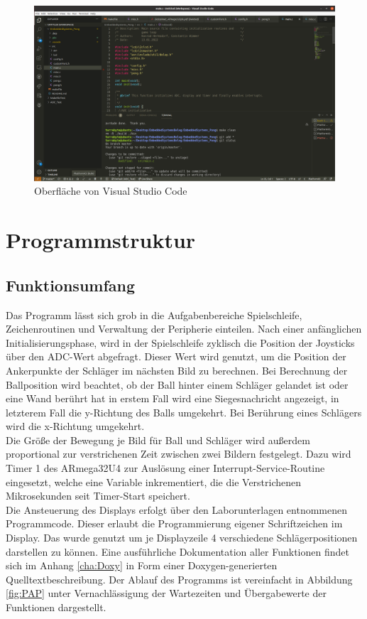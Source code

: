 \begin{figure}[H]
\includegraphics[width=\textwidth]{./Bilder/Code.png}
\caption{Oberfläche von Visual Studio Code}
\end{figure}

\section{Programmstruktur}
\subsection{Funktionsumfang}
\label{sec:Funktionsumfang}
Das Programm lässt sich grob in die Aufgabenbereiche Spielschleife, Zeichenroutinen und Verwaltung der Peripherie einteilen. Nach einer anfänglichen Initialisierungsphase, wird in der Spielschleife zyklisch die Position der Joysticks über den ADC-Wert abgefragt. Dieser Wert wird genutzt, um die Position der Ankerpunkte der Schläger im nächsten Bild zu berechnen. Bei Berechnung der Ballposition wird beachtet, ob der Ball hinter einem Schläger gelandet ist oder eine Wand berührt hat in erstem Fall wird eine Siegesnachricht angezeigt, in letzterem Fall die y-Richtung des Balls umgekehrt. Bei Berührung eines Schlägers wird die x-Richtung umgekehrt.\\
Die Größe der Bewegung je Bild für Ball und Schläger wird außerdem proportional zur verstrichenen Zeit zwischen zwei Bildern festgelegt. Dazu wird Timer 1 des ARmega32U4 zur Auslösung einer Interrupt-Service-Routine eingesetzt, welche eine Variable inkrementiert, die die Verstrichenen Mikrosekunden seit Timer-Start speichert.\\
Die Ansteuerung des Displays erfolgt über den Laborunterlagen entnommenen Programmcode. Dieser erlaubt die Programmierung eigener Schriftzeichen im Display. Das wurde genutzt um je Displayzeile 4 verschiedene Schlägerpositionen darstellen zu können.
Eine ausführliche Dokumentation aller Funktionen findet sich im Anhang \ref{cha:Doxy} in Form einer Doxygen-generierten Quelltextbeschreibung. Der Ablauf des Programms ist vereinfacht in Abbildung \ref{fig:PAP} unter Vernachlässigung der Wartezeiten und Übergabewerte der Funktionen dargestellt.

